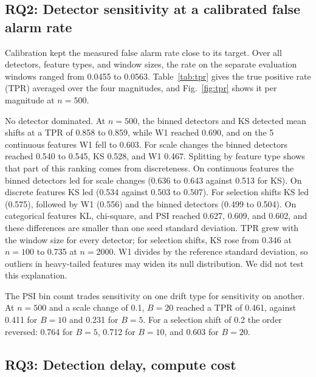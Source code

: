 \documentclass[journal]{IEEEtran}
\begin{document}
\begin{table}[!t]
\caption{False alarms of rule-of-thumb thresholds on no-drift windows (alarms/windows, pooled over features and five seeds).}
\label{tab:null}
\centering
\scriptsize
\setlength{\tabcolsep}{3pt}

\end{table}

\subsection{RQ2: Detector sensitivity at a calibrated false alarm rate}
\label{sec:res-detectors}

Calibration kept the measured false alarm rate close to its target. Over all detectors, feature types, and window sizes, the rate on the separate evaluation windows ranged from 0.0455 to 0.0563. Table~\ref{tab:tpr} gives the true positive rate (TPR) averaged over the four magnitudes, and Fig.~\ref{fig:tpr} shows it per magnitude at $n=500$.

No detector dominated. At $n=500$, the binned detectors and KS detected mean shifts at a TPR of 0.858 to 0.859, while W1 reached 0.690, and on the 5 continuous features W1 fell to 0.603. For scale changes the binned detectors reached 0.540 to 0.545, KS 0.528, and W1 0.467. Splitting by feature type shows that part of this ranking comes from discreteness. On continuous features the binned detectors led for scale changes (0.636 to 0.643 against 0.513 for KS). On discrete features KS led (0.534 against 0.503 to 0.507). For selection shifts KS led (0.575), followed by W1 (0.556) and the binned detectors (0.499 to 0.504). On categorical features KL, chi-square, and PSI reached 0.627, 0.609, and 0.602, and these differences are smaller than one seed standard deviation. TPR grew with the window size for every detector; for selection shifts, KS rose from 0.346 at $n=100$ to 0.735 at $n=2000$. W1 divides by the reference standard deviation, so outliers in heavy-tailed features may widen its null distribution. We did not test this explanation.

The PSI bin count trades sensitivity on one drift type for sensitivity on another. At $n=500$ and a scale change of 0.1, $B=20$ reached a TPR of 0.461, against 0.411 for $B=10$ and 0.231 for $B=5$. For a selection shift of 0.2 the order reversed: 0.764 for $B=5$, 0.712 for $B=10$, and 0.603 for $B=20$.

\subsection{RQ3: Detection delay, compute cost}
\label{sec:res-delay}
\end{document}
